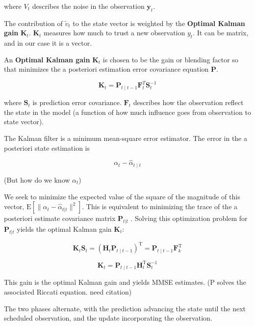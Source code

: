 where $V_t$ describes the noise in the observation $\mathbf{y}_t$.


The contribution of $\tilde{v}_t$ to the state vector is weighted by the \textbf{Optimal Kalman gain} $\mathbf{K}_t$. $\mathbf{K}_t$ measures how much to trust a new observation ${y}_t$. It can be matrix, and in our case it is a vector.



An \textbf{Optimal Kalman gain} $\mathbf{K}_t$ is chosen to be the gain or blending factor so that minimizes the a posteriori estimation error covariance equation $\mathbf{P}$.


$$\mathbf{K}_t = \mathbf{P}_{t\mid t-1}\mathbf{F}_t^T \mathbf{S}_t^{-1}$$



where $\mathbf{S}_t$ is prediction error covariance.  $\mathbf{F}_t$ describes  how the observation reflect the state in the model (a function of how much influence goes from observation to state vector).





The Kalman filter is a minimum mean-square error estimator. The error in the a posteriori state estimation is


$$\alpha_{t} - \hat{\alpha}_{t\mid t}$$

(But how do we know $\alpha_{t}$)


We seek to minimize the expected value of the square of the magnitude of this vector, $\textrm{E}[\|\alpha_{t} - \hat{\alpha}_{t|t}\|^2]$. This is equivalent to minimizing the trace of the a posteriori estimate covariance matrix $\mathbf{P}_{t|t}$ . Solving this optimization problem for $\mathbf{P}_{t|t}$ yields the optimal Kalman gain  $\mathbf{K}_t$:


$$\mathbf{K}_t \mathbf{S}_t = (\mathbf{H}_t \mathbf{P}_{t\mid t-1})^\text{T} = \mathbf{P}_{t\mid t-1} \mathbf{F}_k^\text{T}$$


$$\mathbf{K}_{t} = \mathbf{P}_{t\mid t-1} \mathbf{H}_t^\text{T} \mathbf{S}_t^{-1}$$


This gain  is  the optimal Kalman gain and yields MMSE estimates.  (P solves the associated Riccati equation. need citation)



The two phases alternate, with the prediction advancing the state until the next scheduled observation, and the update incorporating the observation. 


\label{chapter:appendixB}

